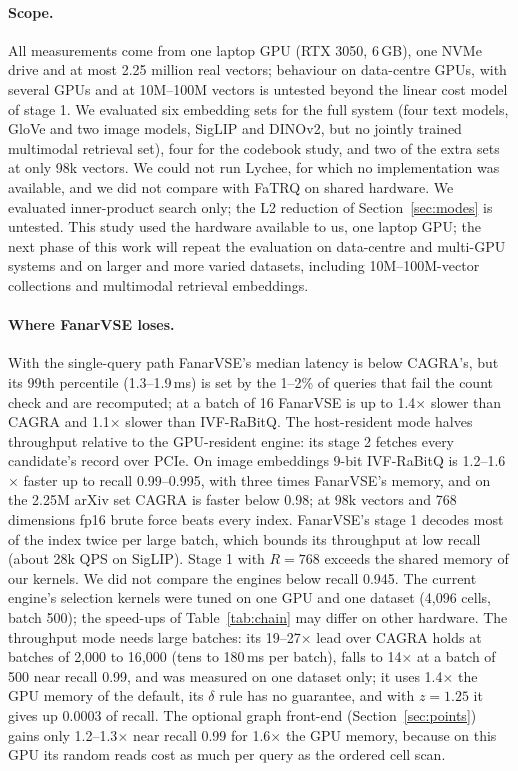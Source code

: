 \documentclass[fleqn,10pt]{wlscirep}
\begin{document}
\paragraph{Scope.} All measurements come from one laptop GPU (RTX 3050, 6\,GB), one NVMe drive and at most 2.25 million real vectors; behaviour on data-centre GPUs, with several GPUs and at 10M--100M vectors is untested beyond the linear cost model of stage 1. We evaluated six embedding sets for the full system (four text models, GloVe and two image models, SigLIP and DINOv2, but no jointly trained multimodal retrieval set), four for the codebook study, and two of the extra sets at only 98k vectors. We could not run Lychee, for which no implementation was available, and we did not compare with FaTRQ on shared hardware. We evaluated inner-product search only; the L2 reduction of Section~\ref{sec:modes} is untested. This study used the hardware available to us, one laptop GPU; the next phase of this work will repeat the evaluation on data-centre and multi-GPU systems and on larger and more varied datasets, including 10M--100M-vector collections and multimodal retrieval embeddings.

\paragraph{Where FanarVSE loses.} With the single-query path FanarVSE's median latency is below CAGRA's, but its 99th percentile (1.3--1.9\,ms) is set by the 1--2\% of queries that fail the count check and are recomputed; at a batch of 16 FanarVSE is up to 1.4$\times$ slower than CAGRA and 1.1$\times$ slower than IVF-RaBitQ. The host-resident mode halves throughput relative to the GPU-resident engine: its stage 2 fetches every candidate's record over PCIe. On image embeddings 9-bit IVF-RaBitQ is 1.2--1.6$\times$ faster up to recall 0.99--0.995, with three times FanarVSE's memory, and on the 2.25M arXiv set CAGRA is faster below 0.98; at 98k vectors and 768 dimensions fp16 brute force beats every index. FanarVSE's stage 1 decodes most of the index twice per large batch, which bounds its throughput at low recall (about 28k QPS on SigLIP). Stage 1 with $R=768$ exceeds the shared memory of our kernels. We did not compare the engines below recall 0.945. The current engine's selection kernels were tuned on one GPU and one dataset (4{,}096 cells, batch 500); the speed-ups of Table~\ref{tab:chain} may differ on other hardware. The throughput mode needs large batches: its 19--27$\times$ lead over CAGRA holds at batches of 2{,}000 to 16{,}000 (tens to 180\,ms per batch), falls to 14$\times$ at a batch of 500 near recall 0.99, and was measured on one dataset only; it uses 1.4$\times$ the GPU memory of the default, its $\delta$ rule has no guarantee, and with $z=1.25$ it gives up 0.0003 of recall. The optional graph front-end (Section~\ref{sec:points}) gains only 1.2--1.3$\times$ near recall 0.99 for 1.6$\times$ the GPU memory, because on this GPU its random reads cost as much per query as the ordered cell scan.
\end{document}
